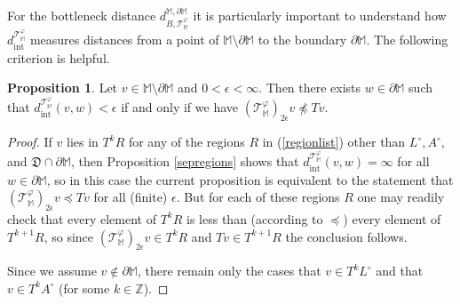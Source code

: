 \documentclass[11pt]{amsart}
\theoremstyle{definition}
\newtheorem{prop}[theorem]{Proposition}
\theoremstyle{remark}
\numberwithin{equation}{section}
\def\ep{\epsilon}
\def\Z{\mathbb{Z}}
\begin{document}
 For the bottleneck distance $d_{B,\mathcal{T}^{\varphi}_{\mathbb{M}}}^{\mathbb{M},\partial\mathbb{M}}$ it is particularly important to understand how $d_{\mathrm{int}}^{\mathcal{T}_{\mathbb{M}}^{\varphi}}$ measures distances from a point of $\mathbb{M}\setminus \partial\mathbb{M}$ to the boundary $\partial\mathbb{M}$.  The following criterion is helpful.
 \begin{prop}\label{bdrydist}
 	Let $v\in\mathbb{M}\setminus\partial\mathbb{M}$ and $0<\ep<\infty$.  Then there exists $w\in\partial \mathbb{M}$ such that $d_{\mathrm{int}}^{\mathcal{T}_{\mathbb{M}}^{\varphi}}(v,w)< \ep$ if and only if we have $(\mathcal{T}_{\mathbb{M}}^{\varphi})_{2\ep}v \npreceq Tv$.
 \end{prop}
 
 \begin{proof}
If $v$ lies in $T^kR$ for any of the regions $R$ in (\ref{regionlist}) other than $L^{\circ},A^{\circ},$ and $\mathfrak{D}\cap\partial\mathbb{M}$, then Proposition \ref{sepregions} shows that
 $d_{\mathrm{int}}^{\mathcal{T}_{\mathbb{M}}^{\varphi}}(v,w)=\infty$ 
	for all $w\in\partial\mathbb{M}$, so in this case the current proposition is equivalent to the statement that 
	$(\mathcal{T}_{\mathbb{M}}^{\varphi})_{2\ep}v \preceq Tv$ for all (finite) $\ep$.  
	But for each of these regions $R$ one may readily check that every element of $T^kR$ is less than (according to $\preceq$) every element of $T^{k+1}R$, so since $(\mathcal{T}_{\mathbb{M}}^{\varphi})_{2\ep}v\in T^kR$ and $Tv\in T^{k+1}R$ the conclusion follows.
	
	Since we assume $v\notin \partial\mathbb{M}$, there remain only the cases that $v\in T^kL^{\circ}$ and that $v\in T^{k}A^{\circ}$ (for some $k\in\Z$).
	

\end{proof}
\end{document}
